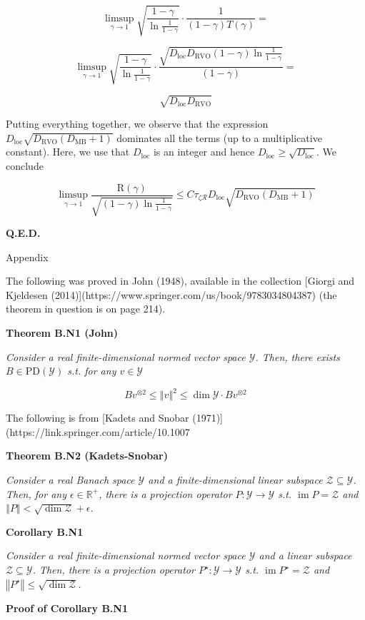 \documentclass[a4paper]{article}
\newcommand{\Co}[1]{}
\newcommand{\Reals}{\mathbb{R}}
\newcommand{\PD}{\mathrm{PD}}
\DeclareMathOperator{\Img}{im}
\newcommand{\Norm}[1]{\left\Vert #1 \right\Vert}
\newcommand{\Y}{\mathcal{Y}}
\newcommand{\Z}{\mathcal{Z}}
\newcommand{\R}{\mathcal{R}}
\newcommand{\DRVO}{D_{\mathrm{RVO}}}
\newcommand{\DMB}{D_{\mathrm{MB}}}
\newcommand{\DL}{D_{\mathrm{loc}}}
\newcommand{\Reg}{\mathrm{R}}
\begin{document}
$$\limsup_{\gamma\rightarrow1}{\sqrt{\frac{1-\gamma}{\ln{\frac{1}{1-\gamma}}}}\cdot\frac{1}{(1-\gamma)T(\gamma)}}=$$

$$\limsup_{\gamma\rightarrow1}{\sqrt{\frac{1-\gamma}{\ln{\frac{1}{1-\gamma}}}}\cdot\frac{\sqrt{\DL\DRVO(1-\gamma)\ln\frac{1}{1-\gamma}}}{(1-\gamma)}}=$$

$$\sqrt{\DL\DRVO}$$

Putting everything together, we observe that the expression $\DL\sqrt{\DRVO(\DMB+1)}$ dominates all the terms (up to a multiplicative constant). Here, we use that $\DL$ is an integer and hence $\DL\geq\sqrt{\DL}$. We conclude

$$\limsup_{\gamma\rightarrow1}{\frac{\Reg(\gamma)}{\sqrt{(1-\gamma)\ln{\frac{1}{1-\gamma}}}}}\leq C\tau_{\zeta\R}\DL\sqrt{\DRVO(\DMB+1)}$$

\textbf{Q.E.D.}\Co{b}

\begin{Huge}Appendix\end{Huge}

The following was proved in John (1948), available in the collection [Giorgi and Kjeldesen (2014)](https://www.springer.com/us/book/9783034804387) (the theorem in question is on page 214). 

\textbf{Theorem B.N1 (John)}\Co{b}

\textit{Consider a real finite-dimensional normed vector space $\Y$. Then, there exists $B\in\PD(\Y)$ s.t. for any $v\in\Y$}\Co{i}

$$Bv^{\otimes2}\leq\Norm{v}^2\leq\dim{\Y}\cdot Bv^{\otimes2}$$

The following is from [Kadets and Snobar (1971)](https://link.springer.com/article/10.1007%

\textbf{Theorem B.N2 (Kadets-Snobar)}\Co{b}

\textit{Consider a real Banach space $\Y$ and a finite-dimensional linear subspace $\Z\subseteq\Y$. Then, for any $\epsilon\in\Reals^+$, there is a projection operator $P:\Y\rightarrow\Y$ s.t. $\Img{P}=\Z$ and $\Norm{P}<\sqrt{\dim{\Z}}+\epsilon$.}\Co{i}

\textbf{Corollary B.N1}\Co{b}

\textit{Consider a real finite-dimensional normed vector space $\Y$ and a linear subspace $\Z\subseteq\Y$. Then, there is a projection operator $P^\star:\Y\rightarrow\Y$ s.t. $\Img{P^\star}=\Z$ and $\Norm{P^\star}\leq\sqrt{\dim{\Z}}$.}\Co{i}

\textbf{Proof of Corollary B.N1}\Co{b}
\end{document}
